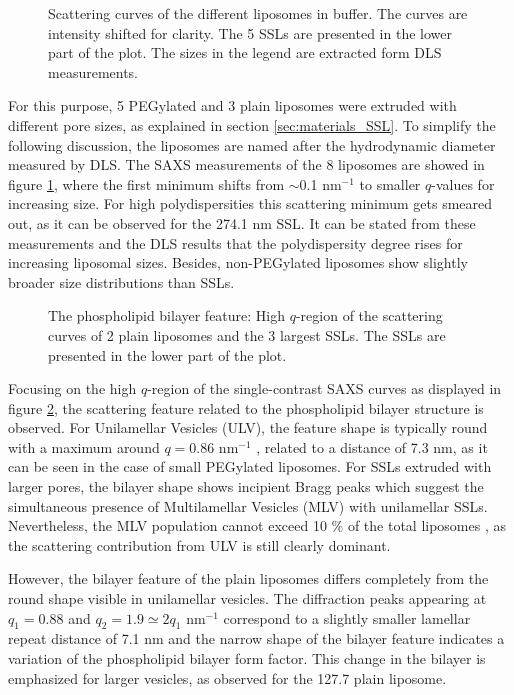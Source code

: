 \begin{figure}
	\centering
		
		\caption{Scattering curves of the different liposomes in buffer. The curves are intensity shifted for clarity. The 5 SSLs are presented in the lower part of the plot. The sizes in the legend are extracted form DLS measurements.}
		\label{fig:SSLSingleContrast}
\end{figure}

For this purpose, 5 PEGylated and 3 plain liposomes were extruded with different pore sizes, as explained in section \ref{sec:materials_SSL}. To simplify the following discussion, the liposomes are named after the hydrodynamic diameter measured by DLS. The SAXS measurements of the 8 liposomes are showed in figure \ref{fig:SSLSingleContrast}, where the first minimum shifts from $\sim$0.1 nm$^{-1}$ to smaller $q$-values for increasing size. For high polydispersities this scattering minimum gets smeared out, as it can be observed for the 274.1 nm SSL. It can be stated from these measurements and the DLS results that the polydispersity degree rises for increasing liposomal sizes. Besides, non-PEGylated liposomes show slightly broader size distributions than SSLs.

\begin{figure}
	\centering
		
		\caption{The phospholipid bilayer feature: High $q$-region of the scattering curves of 2 plain liposomes and the 3 largest SSLs. The SSLs are presented in the lower part of the plot.}
		\label{fig:SSLSingleContrastBilayer}
\end{figure}

Focusing on the high $q$-region of the single-contrast SAXS curves as displayed in figure \ref{fig:SSLSingleContrastBilayer}, the scattering feature related to the phospholipid bilayer structure is observed. For Unilamellar Vesicles (ULV), the feature shape is typically round with a maximum around $q=0.86$ nm$^{-1}$ \cite{varga_characterization_2012}, related to a distance of 7.3 nm, as it can be seen in the case of small PEGylated liposomes. For SSLs extruded with larger pores, the bilayer shape shows incipient Bragg peaks which suggest the simultaneous presence of Multilamellar Vesicles (MLV) with unilamellar SSLs. Nevertheless, the MLV population cannot exceed 10 $\%$ of the total liposomes \cite{sakuragi_transformation_2011}, as the scattering contribution from ULV is still clearly dominant.

However, the bilayer feature of the plain liposomes differs completely from the round shape visible in unilamellar vesicles. The diffraction peaks appearing at $q_1=0.88$ and $q_2=1.9\simeq2q_1$ nm$^{-1}$ correspond to a slightly smaller lamellar repeat distance of 7.1 nm and the narrow shape of the bilayer feature indicates a variation of the phospholipid bilayer form factor. This change in the bilayer is emphasized for larger vesicles, as observed for the 127.7 plain liposome.

